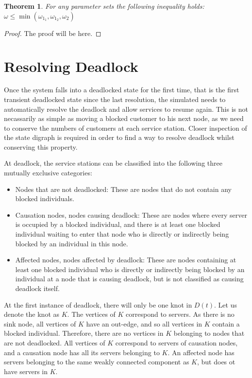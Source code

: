 \documentclass{article}
\newtheorem{theorem}{Theorem}
\begin{document}
\begin{theorem}
For any parameter sets the following inequality holds:
$\omega \leq \min(\omega_{1_1}, \omega_{1_2}, \omega_2)$
\end{theorem}

\begin{proof}
The proof will be here.
\end{proof}


\section{Resolving Deadlock}
Once the system falls into a deadlocked state for the first time, that is the first transient deadlocked state since the last resolution, the simulated needs to automatically resolve the deadlock and allow services to resume again.
This is not necassarily as simple as moving a blocked customer to his next node, as we need to conserve the numbers of customers at each service station.
Closer inspection of the state digraph is required in order to find a way to resolve deadlock whilst conserving this property.

At deadlock, the service stations can be classified into the following three mutually exclusive categories:
\begin{itemize}
    \item Nodes that are not deadlocked: These are nodes that do not contain any blocked individuals.
    \item Causation nodes, nodes causing deadlock: These are nodes where every server is occupied by a blocked individual, and there is at least one blocked individual waiting to enter that node who is directly or indirectly being blocked by an individual in this node.
    \item Affected nodes, nodes affected by deadlock: These are nodes containing at least one blocked individual who is directly or indirectly being blocked by an individual at a node that is causing deadlock, but is not classified as causing deadlock itself.
\end{itemize}

At the first instance of deadlock, there will only be one knot in $D(t)$.
Let us denote the knot as $K$.
The vertices of $K$ correspond to servers.
As there is no sink node, all vertices of $K$ have an out-edge, and so all vertices in $K$ contain a blocked individual.
Therefore, there are no vertices in $K$ belonging to nodes that are not deadlocked.
All vertices of $K$ correspond to servers of causation nodes, and a causation node has all its servers belonging to $K$.
An affected node has servers belonging to the same weakly connected component as $K$, but does ot have servers in $K$.
\end{document}
